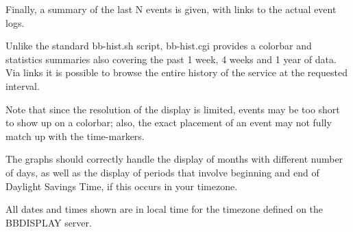   Finally, a summary of the last N events is given, with links to the actual event logs. 


  Unlike the standard bb-hist.sh script, bb-hist.cgi provides a
  colorbar and statistics summaries also covering the past 1 week, 4
  weeks and 1 year of data. Via links it is possible to browse the
  entire history of the service at the requested interval. 



  Note that since the resolution of the display is limited, events may
  be too short to show up on a colorbar; also, the exact placement of
  an event may not fully match up with the time-markers. 



  The graphs should correctly handle the display of months with
  different number of days, as well as the display of periods that
  involve beginning and end of Daylight Savings Time, if this occurs
  in your timezone. 



  All dates and times shown are in local time for the timezone defined on the BBDISPLAY server. 


 


 
